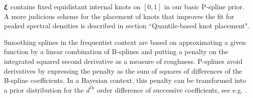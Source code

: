 \documentclass[twocolumn,final]{svjour3}
\newcommand{\bm}[1]{\mbox{\boldmath $#1$}}
\begin{document}
$\bm{\xi}$ contains fixed equidistant internal knots on $[0,1]$ in our basic P-spline prior.  A more judicious scheme for the placement  of knots that improves the fit for peaked spectral densities is described in  section ``Quantile-based knot placement".

Smoothing splines in the frequentist context are based on approximating a given function by a linear combination of B-splines and
putting a penalty on the integrated squared second derivative  as a measure of roughness. P-splines avoid derivatives by expressing the penalty as the sum of squares of differences of the B-spline coefficients.
In a Bayesian context, this penalty can be transformed into a prior distribution for the $d^{\text{th}}$ order difference of successive coefficients, see e.g. \cite{Lang:2004}.
\end{document}
